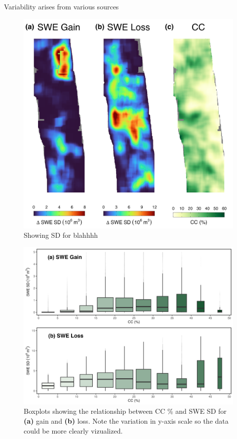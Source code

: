 Variability arises from various sources

\clearpage
\begin{figure}[t]
\centering
\includegraphics[width=\textwidth]{figures/ch4_figs/sd_vs_cc_map_55x55.png}
\centering
\caption{Showing SD for blahhhh}
\end{figure}

\clearpage
\begin{figure}[t]
\centering
\includegraphics[width=\textwidth]{figures/ch4_figs/swe_sd_bp_55x55.png}
\centering
\caption{Boxplots showing the relationship between CC \% and SWE SD for \textbf{(a)} gain and \textbf{(b)} loss. Note the variation in y-axis scale so the data could be more clearly vizualized.}
\end{figure}

